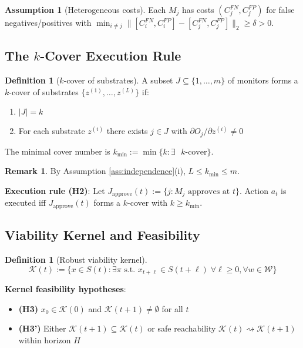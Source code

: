 \documentclass[11pt,a4paper]{article}
\theoremstyle{definition}
\newtheorem{definition}[theorem]{Definition}
\newtheorem{assumption}[theorem]{Assumption}
\newtheorem{remark}[theorem]{Remark}
\newcommand{\W}{\mathcal{W}}
\newcommand{\K}{\mathcal{K}}
\begin{document}
\begin{assumption}[Heterogeneous costs]\label{ass:heterogeneous}
Each $M_j$ has costs $(C_j^{FN}, C_j^{FP})$ for false negatives/positives with $\min_{i\neq j} \|[C_i^{FN}, C_i^{FP}] - [C_j^{FN}, C_j^{FP}]\|_2 \geq \delta > 0$.
\end{assumption}

\subsection{The $k$-Cover Execution Rule}

\begin{definition}[$k$-cover of substrates]\label{def:kcover}
A subset $J \subseteq \{1, \ldots, m\}$ of monitors forms a $k$-cover of substrates $\{z^{(1)}, \ldots, z^{(L)}\}$ if:
\begin{enumerate}
\item $|J| = k$
\item For each substrate $z^{(i)}$ there exists $j \in J$ with $\partial O_j/\partial z^{(i)} \neq 0$
\end{enumerate}
The minimal cover number is $k_{\min} := \min\{k : \exists \text{ $k$-cover}\}$.
\end{definition}

\begin{remark}
By Assumption \ref{ass:independence}(i), $L \leq k_{\min} \leq m$.
\end{remark}

\textbf{Execution rule (H2)}: Let $J_{\text{approve}}(t) := \{j : M_j \text{ approves at } t\}$. Action $a_t$ is executed iff $J_{\text{approve}}(t)$ forms a $k$-cover with $k \geq k_{\min}$.

\subsection{Viability Kernel and Feasibility}

\begin{definition}[Robust viability kernel]\label{def:kernel}
\begin{equation}
\K(t) := \{x \in S(t) : \exists \pi \text{ s.t. } x_{t+\ell} \in S(t + \ell) \;\forall \ell \geq 0, \forall w \in \W\}
\end{equation}
\end{definition}

\textbf{Kernel feasibility hypotheses}:
\begin{itemize}
\item \textbf{(H3)} $x_0 \in \K(0)$ and $\K(t + 1) \neq \emptyset$ for all $t$
\item \textbf{(H3')} Either $\K(t + 1) \subseteq \K(t)$ or safe reachability $\K(t) \rightsquigarrow \K(t + 1)$ within horizon $H$
\end{itemize}
\end{document}
